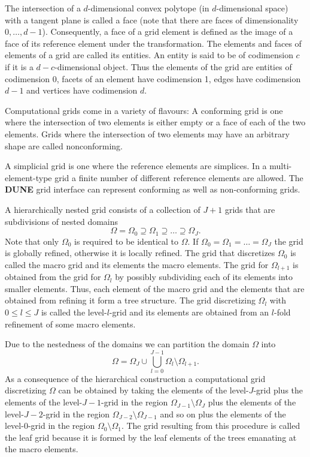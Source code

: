 \documentclass[11pt,a4paper,headinclude,footinclude,DIV16,normalheadings]{scrreprt}
\newcommand{\Dune}{{\sf\bfseries DUNE}\xspace}
\begin{document}

The intersection of a $d$-dimensional convex polytope (in
$d$-dimensional space) with a
tangent plane is called a face (note that there are faces of
dimensionality $0,\ldots,d-1$). Consequently, a face of a grid element
is defined as the image of a face of its reference element under the
transformation. The elements and faces of elements of a grid are
called its entities. An entity is said to be of codimension $c$ if it
is a $d-c$-dimensional object. Thus the elements of the grid are
entities of codimension 0, facets of an element have codimension 1,
edges have codimension $d-1$ and vertices have codimension $d$.


Computational grids come in a variety of flavours: A
{conforming} grid is one where the intersection of two
elements is either empty or a face of each of the two elements. 
Grids where the intersection of two elements may have an
arbitrary shape are called {nonconforming}. 


A {simplicial} grid is one where the reference elements are
simplices. In a {multi-element-type} grid a finite number of
different reference elements are allowed. The \Dune{} grid interface
can represent conforming as well as non-conforming grids.


A {hierarchically nested} grid consists of a collection of $J+1$
grids that are subdivisions of nested domains $$\Omega=\Omega_0 \supseteq \Omega_1 \supseteq
\ldots \supseteq \Omega_J.$$ Note that only $\Omega_0$ is required to
be identical to $\Omega$. If $\Omega_0=\Omega_1=\ldots=\Omega_J$ the
grid is {globally refined}, otherwise it is {locally refined}.
The grid that discretizes $\Omega_0$ is called the macro grid and its
elements the macro elements. The
grid for $\Omega_{l+1}$ is obtained from the grid
for $\Omega_l$ by possibly subdividing each of its elements into
smaller elements. Thus, each element of the macro grid and the
elements that are obtained from refining it form a tree structure. The
grid discretizing $\Omega_l$ with $0\leq l \leq J$ is called the level-$l$-grid and its
elements are obtained from an $l$-fold refinement of some macro elements.


Due to the nestedness of the domains we can partition the domain
$\Omega$ into $$\Omega = \Omega_J \cup \bigcup_{l=0}^{J-1}
\Omega_l\setminus\Omega_{l+1}.$$ As a consequence of the hierarchical
construction a computational grid discretizing $\Omega$ can be
obtained by taking the elements of the level-$J$-grid plus
the elements of the level-$J-1$-grid in the region
$\Omega_{J-1}\setminus\Omega_{J}$ plus the elements of the level-$J-2$-grid in the region
$\Omega_{J-2}\setminus\Omega_{J-1}$ and so on plus the elements of the level-$0$-grid in the region
$\Omega_{0}\setminus\Omega_{1}$. The grid resulting from this
procedure is called the leaf grid
because it is formed by the leaf elements of the trees emanating at
the macro elements. 
\end{document}
